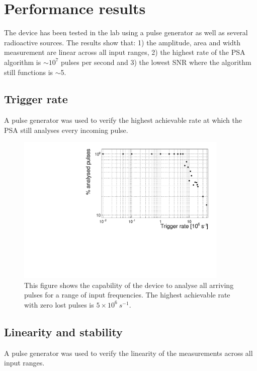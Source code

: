 \documentclass[12pt]{packages/mytustyle}  %
\begin{document}
\clearpage
\section{Performance results}
\label{sec:perres}
The device has been tested in the lab using a pulse generator as well as several radioactive sources. The results show that: 1) the amplitude, area and width measurement are linear across all input ranges, 2) the highest rate of the PSA algorithm is $\sim10^7$ pulses per second and 3) the lowest SNR where the algorithm still functions is $\sim$5.  

\subsection{Trigger rate}
A pulse generator was used to verify the highest achievable rate at which the PSA still analyses every incoming pulse.

\begin{figure}[!t]
\centering
\includegraphics[width=0.9\textwidth]{../../scripts/05_current_monitoring/PulseGenTests/plots/freq}
\caption{This figure shows the capability of the device to analyse all arriving pulses for a range of input frequencies. The highest achievable rate with zero lost pulses is $5\times10^6~s^{-1}$.}
\label{fig:trigrate}
\end{figure}

\subsection{Linearity and stability}
A pulse generator was used to verify the linearity of the measurements across all input ranges.
\end{document}
